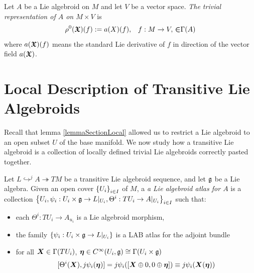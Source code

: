 \begin{definition}
Let $A$ be a Lie algebroid on $M$ and let $V$ be a vector space. \emph{The trivial representation of $A$ on $M \times V$} is
\begin{align*}
    \rho^0(\bm{\mathfrak{X}})(f) := a(X)(f), && f: M \to V,\, \bm{\mathfrak{\in}} \Gamma(A)
\end{align*}
where $a(\bm{\mathfrak{X}})(f)$ means the standard Lie derivative of $f$ in direction of the vector field $a(\bm{\mathfrak{X}})$.
\end{definition}




\section{Local Description of Transitive Lie Algebroids}

Recall that lemma \ref{lemmaSectionLocal} allowed us to restrict a Lie algebroid to an open subset $U$ of the base manifold. We now study how a transitive Lie algebroid is a collection of locally defined trivial Lie algebroids correctly pasted together.

\begin{definition}
Let $L \hookrightarrow^j A \twoheadrightarrow TM$ be a transitive Lie algebroid sequence, and let $\mathfrak{g}$ be a Lie algebra. Given an open cover $\left\{ U_i \right\}_{i \in I}$ of $M$, a \emph{a Lie algebroid atlas for $A$} is a collection $\left\{ U_i, \psi_i:U_i \times \mathfrak{g} \to L|_{U_i}, \Theta^i: TU_i \to A|_{U_i} \right\}_{i \in I}$ such that:
    \begin{itemize}
    
    \item each $\Theta^i: TU_i \to A_{u_i}$ is a Lie algebroid morphism,
    
    \item the family $\left\{ \psi_i:U_i \times \mathfrak{g} \to L|_{U_i} \right\}$ is a LAB atlas for the adjoint bundle 
    
    \item for all $\bm{X} \in \Gamma(TU_i)$, $\bm{\eta} \in C^\infty(U_i, \mathfrak{g}) \cong \Gamma(U_i \times \mathfrak{g})$
        \begin{align} \label{eqnCompLocal}
            [\Theta^i(\bm{X}), j\psi_i(\bm{\eta})] = j\psi_i([\bm{X} \oplus 0, 0 \oplus \bm{\eta}]) \equiv j\psi_i(\bm{X}(\bm{\eta})) 
        \end{align}
    
    \end{itemize}
\end{definition}

